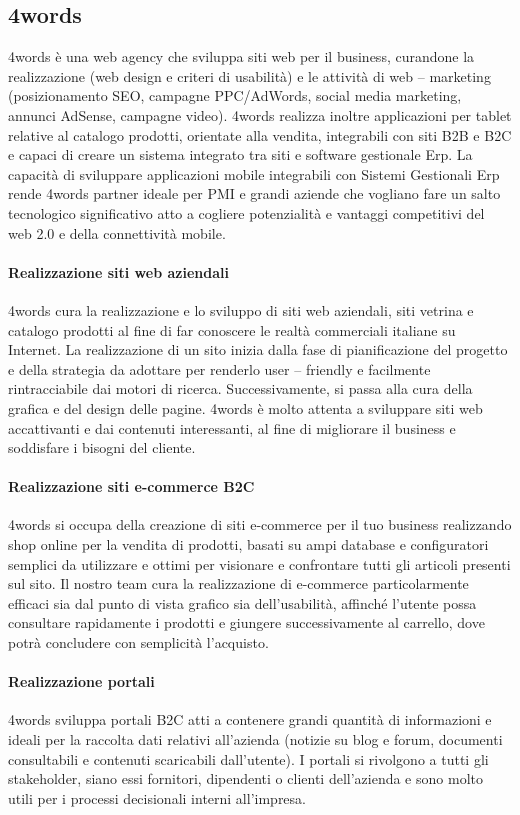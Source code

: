 \subsection{4words}
4words è una web agency che sviluppa siti web per il business, curandone la realizzazione (web design e criteri di usabilità) e le attività di web – marketing (posizionamento \Gls{SEO}, campagne \Gls{PPC}/AdWords, social media marketing, annunci AdSense, campagne video).
4words realizza inoltre applicazioni per tablet relative al catalogo prodotti, orientate alla vendita, integrabili con siti B2B e B2C e capaci di creare un sistema integrato tra siti e software gestionale Erp.
La capacità di sviluppare applicazioni mobile integrabili con Sistemi Gestionali Erp rende 4words partner ideale per \Gls{PMI} e grandi aziende che vogliano fare un salto tecnologico significativo atto a cogliere potenzialità e vantaggi competitivi del web 2.0 e della connettività mobile.
\paragraph{Realizzazione siti web aziendali} 4words cura la realizzazione e lo sviluppo di siti web aziendali, siti vetrina e catalogo prodotti al fine di far conoscere le realtà commerciali italiane su Internet. La realizzazione di un sito inizia dalla fase di pianificazione del progetto e della strategia da adottare per renderlo user – friendly e facilmente rintracciabile dai motori di ricerca. Successivamente, si passa alla cura della grafica e del design delle pagine. 4words è molto attenta a sviluppare siti web accattivanti e dai contenuti interessanti, al fine di migliorare il business e soddisfare i bisogni del cliente.
\paragraph{Realizzazione siti e-commerce B2C} 4words si occupa della creazione di siti e-commerce per il tuo business realizzando shop online per la vendita di prodotti, basati su ampi database e configuratori semplici da utilizzare e ottimi per visionare e confrontare tutti gli articoli presenti sul sito. Il nostro team cura la realizzazione di e-commerce particolarmente efficaci sia dal punto di vista grafico sia dell'usabilità, affinché l'utente possa consultare rapidamente i prodotti e giungere successivamente al carrello, dove potrà concludere con semplicità l'acquisto.
\paragraph{Realizzazione portali} 4words sviluppa portali B2C atti a contenere grandi quantità di informazioni e ideali per la raccolta dati relativi all'azienda (notizie su blog e forum, documenti consultabili e contenuti scaricabili dall'utente). I portali si rivolgono a tutti gli \gls{stakeholder}, siano essi fornitori, dipendenti o clienti dell'azienda e sono molto utili per i processi decisionali interni all'impresa.
